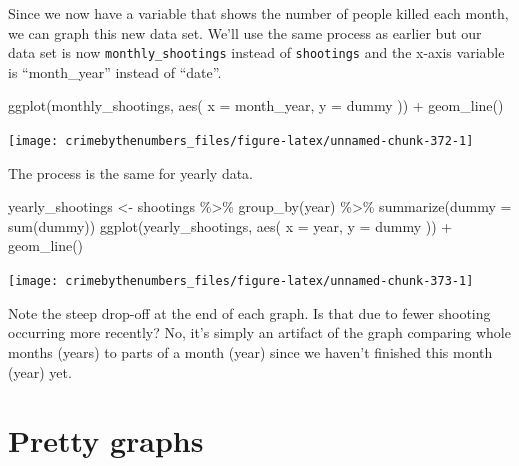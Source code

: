 \documentclass[
]{krantz}
\makeatletter
\newenvironment{Shaded}{\begin{snugshade}}{\end{snugshade}}
\newcommand{\AttributeTok}[1]{\textcolor[rgb]{0.61,0.61,0.61}{#1}}
\newcommand{\FunctionTok}[1]{\textcolor[rgb]{0,0,0}{#1}}
\newcommand{\NormalTok}[1]{#1}
\newcommand{\OtherTok}[1]{\textcolor[rgb]{0.37,0.37,0.37}{#1}}
\newcommand{\SpecialCharTok}[1]{\textcolor[rgb]{0,0,0}{#1}}
\newenvironment{kframe}{%
\medskip{}
\setlength{\fboxsep}{.8em}
 \def\at@end@of@kframe{}%
 \ifinner\ifhmode%
  \def\at@end@of@kframe{\end{minipage}}%
  \begin{minipage}{\columnwidth}%
 \fi\fi%
 \def\FrameCommand##1{\hskip\@totalleftmargin \hskip-\fboxsep
 \colorbox{shadecolor}{##1}\hskip-\fboxsep
     \hskip-\linewidth \hskip-\@totalleftmargin \hskip\columnwidth}%
 \MakeFramed {\advance\hsize-\width
   \@totalleftmargin\z@ \linewidth\hsize
   \@setminipage}}%
 {\par\unskip\endMakeFramed%
 \at@end@of@kframe}
\renewenvironment{Shaded}{\begin{kframe}}{\end{kframe}}
\makeatother
\begin{document}
Since we now have a variable that shows the number of people
killed each month, we can graph this new data set. We'll use
the same process as earlier but our data set is now
\texttt{monthly\_shootings} instead of \texttt{shootings}
and the x-axis variable is ``month\_year'' instead of
``date''.

\begin{Shaded}
\begin{Highlighting}[]
\FunctionTok{ggplot}\NormalTok{(monthly\_shootings, }\FunctionTok{aes}\NormalTok{(}
  \AttributeTok{x =}\NormalTok{ month\_year,}
  \AttributeTok{y =}\NormalTok{ dummy}
\NormalTok{)) }\SpecialCharTok{+}
  \FunctionTok{geom\_line}\NormalTok{()}
\end{Highlighting}
\end{Shaded}

\begin{center}\texttt{[image: crimebythenumbers\_files/figure-latex/unnamed-chunk-372-1]} \end{center}

The process is the same for yearly data.

\begin{Shaded}
\begin{Highlighting}[]
\NormalTok{yearly\_shootings }\OtherTok{\textless{}{-}}\NormalTok{ shootings }\SpecialCharTok{\%\textgreater{}\%}
  \FunctionTok{group\_by}\NormalTok{(year) }\SpecialCharTok{\%\textgreater{}\%}
  \FunctionTok{summarize}\NormalTok{(}\AttributeTok{dummy =} \FunctionTok{sum}\NormalTok{(dummy))}
\FunctionTok{ggplot}\NormalTok{(yearly\_shootings, }\FunctionTok{aes}\NormalTok{(}
  \AttributeTok{x =}\NormalTok{ year,}
  \AttributeTok{y =}\NormalTok{ dummy}
\NormalTok{)) }\SpecialCharTok{+}
  \FunctionTok{geom\_line}\NormalTok{()}
\end{Highlighting}
\end{Shaded}

\begin{center}\texttt{[image: crimebythenumbers\_files/figure-latex/unnamed-chunk-373-1]} \end{center}

Note the steep drop-off at the end of each graph. Is that
due to fewer shooting occurring more recently? No, it's
simply an artifact of the graph comparing whole months
(years) to parts of a month (year) since we haven't finished
this month (year) yet.

\hypertarget{pretty-graphs}{%
\section{Pretty graphs}\label{pretty-graphs}}
\end{document}
